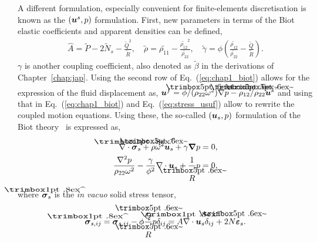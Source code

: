 A different formulation, especially convenient for finite-elements discretisation is known as the $(\boldsymbol u^s, p)$ formulation. First, new parameters in terms of the Biot elastic coefficients and apparent densities can be defined, 
    \begin{equation}
        \begin{split}
            \hat A = \tilde P - 2\tilde N_s - \frac{ \tilde Q^2}{ \tilde R}, \quad \tilde \rho = \tilde{\rho_{11}} - \frac{ \tilde{\rho_{12}}^2}{\tilde{ \rho_{22}}},
            \quad \tilde \gamma = \phi \left( \frac{ \tilde{\rho_{12}}}{ \tilde{\rho_{22}}} - \frac{ \tilde Q}{ \tilde R} \right).
        \end{split}
    \end{equation}  
$\gamma$ is another coupling coefficient, also denoted as $\tilde \beta$ in the derivations of Chapter~\ref{chap:jap}. Using the second row of Eq.~(\ref{eq:chap1_biot}) allows for the expression of the fluid displacement as, $\mbf u^f = \phi/(\tilde{\rho_{22}} \omega^2) \nabla p  - \tilde{\rho_{12}}/\tilde{\rho_{22}} \mbf u^s$ and using that in Eq.~(\ref{eq:chap1_biot}) and Eq.~(\ref{eq:stress_usuf}) allow to rewrite the coupled motion equations. 
Using these, the so-called $(\boldsymbol u_s, p)$ formulation of the Biot theory~\cite{atalla1998} is expressed as,
    \begin{equation}
        \begin{aligned}
            \nabla \cdot \mbf{\hat{\sigma}}_s + \tilde \rho \omega^2 \mbf u_s +  \gamma \mbf \nabla p &= 0, \\
            \frac{\nabla^2 p}{\rho_{22} \omega^2} - \frac{\gamma }{\phi^2} \nabla \cdot \mbf u_s + \frac{1}{ \tilde R}p &= 0,
        \end{aligned}
    \end{equation}
where $\mbf{\hat{\sigma}}_s$ is the \emph{in vacuo} solid stress tensor,
\begin{equation}
    \mbf{\hat{\sigma}}_{s, ij} = \mbf \sigma_{s,ij} - \phi \frac{\tilde Q}{\tilde R} p \delta_{ij} = \hat A \nabla \cdot \mbf u_s \delta_{ij} + 2 \tilde N \mbf \varepsilon_s.
\end{equation}


